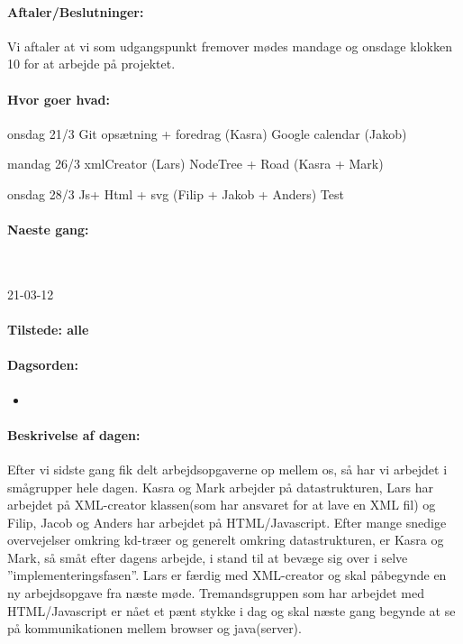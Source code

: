 \documentclass[a4paper,10pt,titlepage]{article}
\begin{document}
		\paragraph{Aftaler/Beslutninger:}
		Vi aftaler at vi som udgangspunkt fremover mødes mandage og onsdage klokken 10 for at arbejde på projektet.
		\paragraph{Hvor goer hvad:}
		onsdag 21/3
Git opsætning + foredrag (Kasra)
Google calendar (Jakob)

mandag 26/3
xmlCreator (Lars)
NodeTree + Road (Kasra + Mark)

onsdag 28/3
Js+ Html + svg (Filip + Jakob + Anders)
Test
		\paragraph{Naeste gang:}\mbox{}\\
			
			
			\begin{center}
		21-03-12
		\end{center}
		
		\paragraph{Tilstede: alle}
		\paragraph{Dagsorden:}
		\begin{itemize}
					\item 
					
		\end{itemize}
		
		\paragraph{Beskrivelse af dagen:}
		Efter vi sidste gang fik delt arbejdsopgaverne op mellem os, så har vi arbejdet i smågrupper hele dagen. 
Kasra og Mark arbejder på datastrukturen, Lars har arbejdet på XML-creator klassen(som har ansvaret for at lave en XML fil) og Filip, Jacob og Anders har arbejdet på HTML/Javascript.
Efter mange snedige overvejelser omkring kd-træer og generelt omkring datastrukturen, er Kasra og Mark, så småt efter dagens arbejde,  i stand til at bevæge sig over i selve ”implementeringsfasen”.  Lars er færdig med XML-creator og skal påbegynde en ny arbejdsopgave fra næste møde. Tremandsgruppen som har arbejdet med HTML/Javascript er nået et pænt stykke i dag og skal næste gang begynde at se på kommunikationen mellem browser og java(server).
\end{document}
